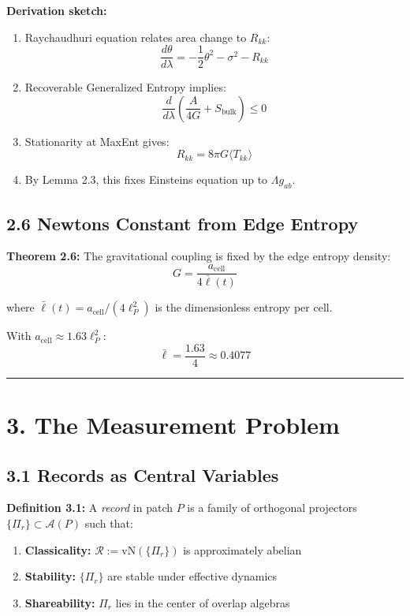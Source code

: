 \textbf{Derivation sketch:}

\begin{enumerate}
\def\labelenumi{\arabic{enumi}.}
\item
  Raychaudhuri equation relates area change to \(R_{kk}\): \[\frac{d\theta}{d\lambda} = -\frac{1}{2}\theta^2 - \sigma^2 - R_{kk}\]
\item
  Recoverable Generalized Entropy implies: \[\frac{d}{d\lambda}\left(\frac{A}{4G} + S_{\text{bulk}}\right) \leq 0\]
\item
  Stationarity at MaxEnt gives: \[R_{kk} = 8\pi G \langle T_{kk} \rangle\]
\item
  By Lemma 2.3, this fixes Einstein\textquotesingle s equation up to \(\Lambda g_{ab}\).
\end{enumerate}

\subsection{2.6 Newton\textquotesingle s Constant from Edge Entropy}\label{26-newtons-constant-from-edge-entropy}

\textbf{Theorem 2.6:} The gravitational coupling is fixed by the edge entropy density: \[G = \frac{a_{\text{cell}}}{4\bar{\ell}(t)}\]

where \(\bar{\ell}(t) = a_{\text{cell}}/(4\ell_P^2)\) is the dimensionless entropy per cell.

With \(a_{\text{cell}} \approx 1.63 \ell_P^2\): \[\bar{\ell} = \frac{1.63}{4} \approx 0.4077\]

\begin{center}\rule{0.5\linewidth}{0.5pt}\end{center}

\section{3. The Measurement Problem}\label{3-the-measurement-problem}

\subsection{3.1 Records as Central Variables}\label{31-records-as-central-variables}

\textbf{Definition 3.1:} A \emph{record} in patch \(P\) is a family of orthogonal projectors \(\{\Pi_r\} \subset \mathcal{A}(P)\) such that:

\begin{enumerate}
\def\labelenumi{\arabic{enumi}.}
\tightlist
\item
  \textbf{Classicality:} \(\mathcal{R} := \text{vN}(\{\Pi_r\})\) is approximately abelian
\item
  \textbf{Stability:} \(\{\Pi_r\}\) are stable under effective dynamics
\item
  \textbf{Shareability:} \(\Pi_r\) lies in the center of overlap algebras
\end{enumerate}

